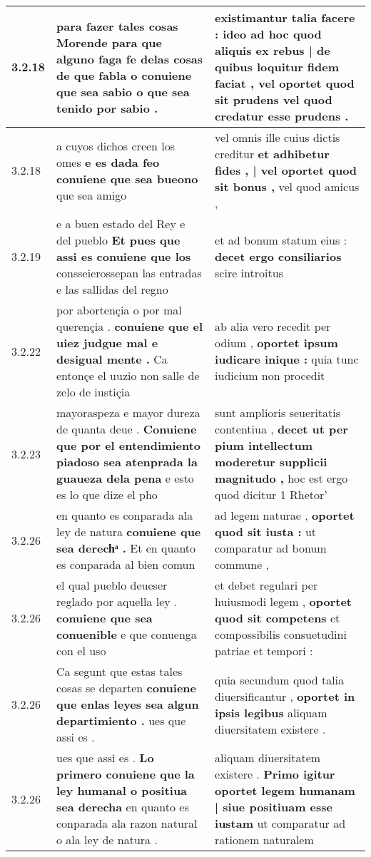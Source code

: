 \begin{tabular}{|p{1cm}|p{6.5cm}|p{6.5cm}|}
3.2.18 & para fazer tales cosas \textbf{ Morende para que alguno faga fe delas cosas de que fabla o conuiene que sea sabio } o que sea tenido por sabio . & existimantur talia facere : \textbf{ ideo ad hoc quod aliquis ex rebus | de quibus loquitur fidem faciat , vel oportet quod sit prudens } vel quod credatur esse prudens . \\\hline
3.2.18 & a cuyos dichos creen los omes \textbf{ e es dada feo conuiene que sea bueono } que sea amigo & vel omnis ille cuius dictis creditur \textbf{ et adhibetur fides , | vel oportet quod sit bonus , } vel quod amicus , \\\hline
3.2.19 & e a buen estado del Rey e del pueblo \textbf{ Et pues que assi es conuiene que los } consseierossepan las entradas e las sallidas del regno & et ad bonum statum eius : \textbf{ decet ergo consiliarios } scire introitus \\\hline
3.2.22 & por abortençia o por mal querençia . \textbf{ conuiene que el uiez judgue mal e desigual mente . } Ca entonçe el uuzio non salle de zelo de iustiçia & ab alia vero recedit per odium , \textbf{ oportet ipsum iudicare inique : } quia tunc iudicium non procedit \\\hline
3.2.23 & mayoraspeza e mayor dureza de quanta deue . \textbf{ Conuiene que por el entendimiento piadoso sea atenprada la guaueza dela pena } e esto es lo que dize el pho & sunt amplioris seueritatis contentiua , \textbf{ decet ut per pium intellectum moderetur supplicii magnitudo , } hoc est ergo quod dicitur 1 Rhetor’ \\\hline
3.2.26 & en quanto es conparada ala ley de natura \textbf{ conuiene que sea derechͣ . } Et en quanto es conparada al bien comun & ad legem naturae , \textbf{ oportet quod sit iusta : } ut comparatur ad bonum commune , \\\hline
3.2.26 & el qual pueblo deueser reglado por aquella ley . \textbf{ conuiene que sea conuenible } e que conuenga con el uso & et debet regulari per huiusmodi legem , \textbf{ oportet quod sit competens } et compossibilis consuetudini patriae et tempori : \\\hline
3.2.26 & Ca segunt que estas tales cosas se departen \textbf{ conuiene que enlas leyes sea algun departimiento . } ues que assi es . & quia secundum quod talia diuersificantur , \textbf{ oportet in ipsis legibus } aliquam diuersitatem existere . \\\hline
3.2.26 & ues que assi es . \textbf{ Lo primero conuiene que la ley humanal o positiua sea derecha } en quanto es conparada ala razon natural o ala ley de natura . & aliquam diuersitatem existere . \textbf{ Primo igitur oportet legem humanam | siue positiuam esse iustam } ut comparatur ad rationem naturalem \\\hline

\end{tabular}
